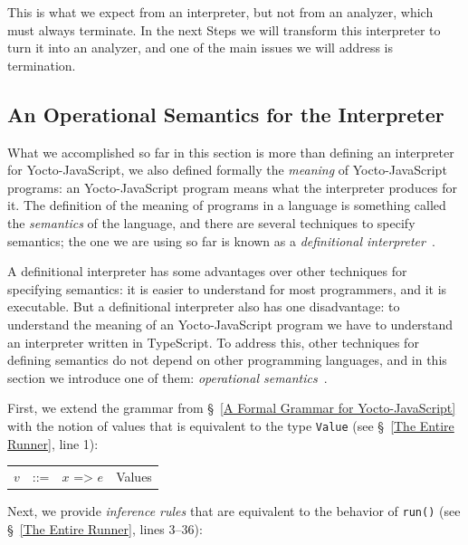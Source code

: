 \documentclass[12pt, oneside]{book}
\begin{document}
This is what we expect from an interpreter, but not from an analyzer, which must always terminate. In the next Steps we will transform this interpreter to turn it into an analyzer, and one of the main issues we will address is termination.

\begin{mdframed}[frametitle = {Advanced}]
\subsection{An Operational Semantics for the Interpreter}
\label{An Operational Semantics for the Interpreter}

What we accomplished so far in this section is more than defining an interpreter for Yocto-JavaScript, we also defined formally the \emph{meaning} of Yocto-JavaScript programs: an Yocto-JavaScript program means what the interpreter produces for it. The definition of the meaning of programs in a language is something called the \emph{semantics} of the language, and there are several techniques to specify semantics; the one we are using so far is known as a \emph{definitional interpreter}~\cite{definitional-interpreters}.

A definitional interpreter has some advantages over other techniques for specifying semantics: it is easier to understand for most programmers, and it is executable. But a definitional interpreter also has one disadvantage: to understand the meaning of an Yocto-JavaScript program we have to understand an interpreter written in TypeScript. To address this, other techniques for defining semantics do not depend on other programming languages, and in this section we introduce one of them: \emph{operational semantics}~\cite{operational-semantics, semantics-engineering, pl}.

First, we extend the grammar from §~\ref{A Formal Grammar for Yocto-JavaScript} with the notion of values that is equivalent to the type \texttt{Value} (see §~\ref{The Entire Runner}, line 1):

\begin{center}
\begin{tabular}{rcll}
$v$ & ::= & $x\texttt{ => }e$ & Values \\
\end{tabular}
\end{center}

Next, we provide \emph{inference rules} that are equivalent to the behavior of \texttt{run()} (see §~\ref{The Entire Runner}, lines 3–36):


\end{mdframed}
\end{document}
